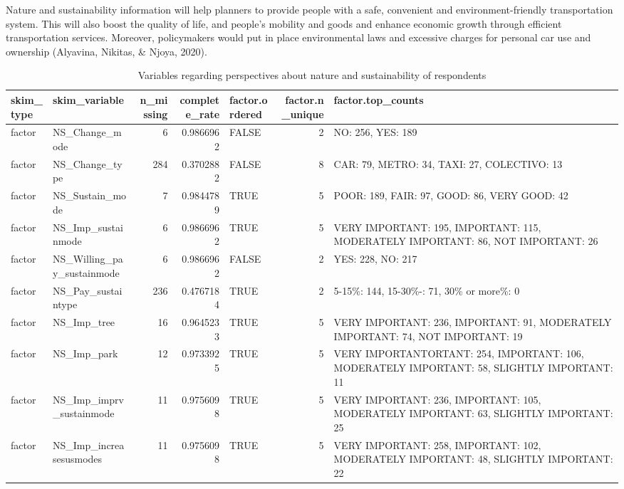 \documentclass[
11pt, %
oneside, %
english, %
singlespacing, %
]{macthesis} %
\newcommand{\blandscape}{\begin{landscape}}
\newcommand{\elandscape}{\end{landscape}}
\begin{document}
Nature and sustainability information will help planners to provide people with a safe, convenient and environment-friendly transportation system. This will also boost the quality of life, and people's mobility and goods and enhance economic growth through efficient transportation services. Moreover, policymakers would put in place environmental laws and excessive charges for personal car use and ownership (Alyavina, Nikitas, \& Njoya, 2020).

\newpage
\blandscape
\begin{table}

\caption{\label{tab:unnamed-chunk-19}\label{tab:Nature-Nustainability-Descriptives}Variables regarding perspectives about nature and sustainability of respondents}
\centering
\fontsize{7}{9}\selectfont
\begin{tabular}[t]{llrrlrl}
\toprule
skim\_type & skim\_variable & n\_missing & complete\_rate & factor.ordered & factor.n\_unique & factor.top\_counts\\
\midrule
factor & NS\_Change\_mode & 6 & 0.9866962 & FALSE & 2 & NO: 256, YES: 189\\
factor & NS\_Change\_type & 284 & 0.3702882 & FALSE & 8 & CAR: 79, METRO: 34, TAXI: 27, COLECTIVO: 13\\
factor & NS\_Sustain\_mode & 7 & 0.9844789 & TRUE & 5 & POOR: 189, FAIR: 97, GOOD: 86, VERY GOOD: 42\\
factor & NS\_Imp\_sustainmode & 6 & 0.9866962 & TRUE & 5 & VERY IMPORTANT: 195, IMPORTANT: 115, MODERATELY IMPORTANT: 86, NOT IMPORTANT: 26\\
factor & NS\_Willing\_pay\_sustainmode & 6 & 0.9866962 & FALSE & 2 & YES: 228, NO: 217\\
\addlinespace
factor & NS\_Pay\_sustaintype & 236 & 0.4767184 & TRUE & 2 & 5-15\%: 144, 15-30\%-: 71, 30\% or more\%: 0\\
factor & NS\_Imp\_tree & 16 & 0.9645233 & TRUE & 5 & VERY IMPORTANT: 236, IMPORTANT: 91, MODERATELY IMPORTANT: 74, NOT IMPORTANT: 19\\
factor & NS\_Imp\_park & 12 & 0.9733925 & TRUE & 5 & VERY IMPORTANTORTANT: 254, IMPORTANT: 106, MODERATELY IMPORTANT: 58, SLIGHTLY IMPORTANT: 11\\
factor & NS\_Imp\_imprv\_sustainmode & 11 & 0.9756098 & TRUE & 5 & VERY IMPORTANT: 236, IMPORTANT: 105, MODERATELY IMPORTANT: 63, SLIGHTLY IMPORTANT: 25\\
factor & NS\_Imp\_increasesusmodes & 11 & 0.9756098 & TRUE & 5 & VERY IMPORTANT: 258, IMPORTANT: 102, MODERATELY IMPORTANT: 48, SLIGHTLY IMPORTANT: 22\\
\bottomrule
\end{tabular}
\end{table}
\elandscape
\newpage
\end{document}
